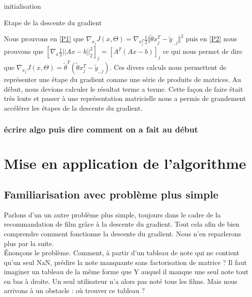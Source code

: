 \documentclass[a4paper,10pt]{article}
\begin{document}
\begin{algorithm}[H]
 initialisation\;
 
 \caption{Etape de la descente du gradient}
\end{algorithm}
Nous prouvons en \ref{P1} que $ \nabla_{x_{j}}J(x, \Theta) = \nabla_{x_{j}^T}\frac{1}{2}\Vert\tilde{\theta}x_{j}^{T}-\tilde{y}_{.,j}\Vert^{2}$
puis en \ref{P2} nous prouvons que $[\nabla_{x} \frac{1}{2}||Ax - b||^{2}_{2}]_{j} = [A^{T}(Ax - b)]_{j}$ ce qui nous permet de dire
que $ \nabla_{x_{j}}J(x, \Theta) =  \tilde{\theta}^{T}(\tilde{\theta}x_{j}^{T}-\tilde{y}_{.,j})$. Ces divers calculs nous permettent
de représenter une étape du gradient comme une série de produits de matrices. Au début, nous devions calculer le résultat terme a terme. Cette
façon de faire était très lente et passer à une représentation matricielle nous a permis de grandement accélérer les étapes de la descente du gradient.
\subsubsection{écrire algo puis dire comment on a fait au début}
\section{Mise en application de l'algorithme}
\subsection{Familiarisation avec problème plus simple}

Parlons d'un un autre problème plus simple, toujours dans le cadre de la recommandation de film grâce à la descente du gradient. Tout cela afin de bien comprendre comment fonctionne la descente du gradient. Nous n'en reparlerons plus par la suite.\\

Énonçons le problème. Comment, à partir d'un tableau de note qui ne contient qu'un seul NaN, prédire la note manquante sans factorisation de matrice ? Il faut imaginer un tableau de la même forme que Y auquel il manque une seul note tout en bas à droite. Un seul utilisateur n'a alors pas noté tous les films. Mais nous arrivons à un obstacle : où trouver ce tableau ?\\
\end{document}
